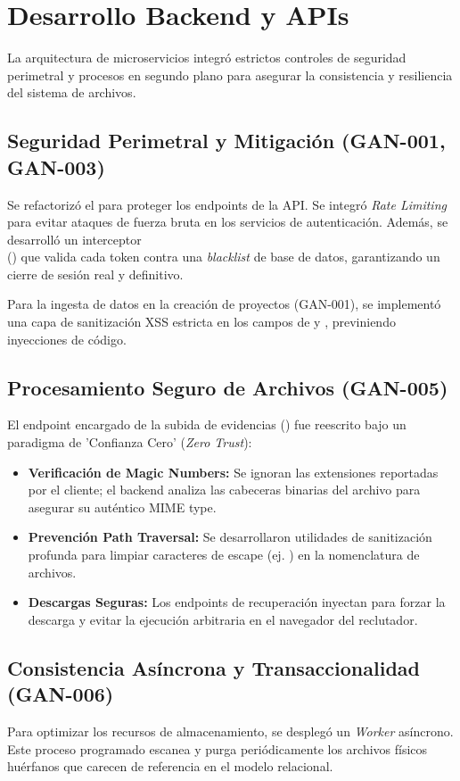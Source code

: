 \section{Desarrollo Backend y APIs}
\label{sec:backend_sprint3}

La arquitectura de microservicios integró estrictos controles de seguridad perimetral y procesos en segundo plano para asegurar la consistencia y resiliencia del sistema de archivos.

\subsection{Seguridad Perimetral y Mitigación (GAN-001, GAN-003)}
Se refactorizó el  para proteger los endpoints de la API. Se integró \textit{Rate Limiting} para evitar ataques de fuerza bruta en los servicios de autenticación. Además, se desarrolló un interceptor \\
() que valida cada token contra una \textit{blacklist} de base de datos, garantizando un cierre de sesión real y definitivo.

Para la ingesta de datos en la creación de proyectos (GAN-001), se implementó una capa de sanitización XSS estricta en los campos de  y , previniendo inyecciones de código.

\subsection{Procesamiento Seguro de Archivos (GAN-005)}
El endpoint encargado de la subida de evidencias () fue reescrito bajo un paradigma de 'Confianza Cero' (\textit{Zero Trust}):

\begin{itemize}[noitemsep]
    \item \textbf{Verificación de Magic Numbers:} Se ignoran las extensiones reportadas por el cliente; el backend analiza las cabeceras binarias del archivo para asegurar su auténtico MIME type.
    \item \textbf{Prevención Path Traversal:} Se desarrollaron utilidades de sanitización profunda para limpiar caracteres de escape (ej. ) en la nomenclatura de archivos.
    \item \textbf{Descargas Seguras:} Los endpoints de recuperación inyectan  para forzar la descarga y evitar la ejecución arbitraria en el navegador del reclutador.
\end{itemize}

\subsection{Consistencia Asíncrona y Transaccionalidad (GAN-006)}
Para optimizar los recursos de almacenamiento, se desplegó un \textit{Worker} asíncrono. Este proceso programado escanea y purga periódicamente los archivos físicos huérfanos que carecen de referencia en el modelo relacional.